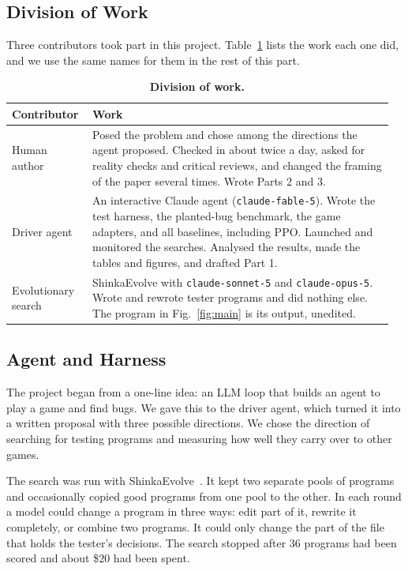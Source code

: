 \documentclass{article}
\begin{document}
\subsection{Division of Work}
\label{sec:roles}
Three contributors took part in this project. Table~\ref{tab:roles} lists the work each one did, and we use the same
names for them in the rest of this part.
\begin{table}[h]\centering\small
\caption{\textbf{Division of work.}}
\label{tab:roles}
\renewcommand{\arraystretch}{1.25}
\begin{tabular}{@{}>{\raggedright\arraybackslash}p{0.2\linewidth}>{\raggedright\arraybackslash}p{0.76\linewidth}@{}}\toprule
Contributor & Work \\ \midrule
Human author & Posed the problem and chose among the directions the agent proposed. Checked in about twice a day,
asked for reality checks and critical reviews, and changed the framing of the paper several times. Wrote Parts 2
and 3. \\ \midrule
Driver agent & An interactive Claude agent (\texttt{claude-fable-5}). Wrote the test harness, the planted-bug
benchmark, the game adapters, and all baselines, including PPO. Launched and monitored the searches. Analysed the
results, made the tables and figures, and drafted Part 1. \\ \midrule
Evolutionary search & ShinkaEvolve with \texttt{claude-sonnet-5} and \texttt{claude-opus-5}. Wrote and rewrote tester
programs and did nothing else. The program in Fig.~\ref{fig:main} is its output, unedited. \\ \bottomrule
\end{tabular}
\end{table}

\subsection{Agent and Harness}
\label{sec:agent}
The project began from a one-line idea: an LLM loop that builds an agent to play a game and find bugs. We gave this to
the driver agent, which turned it into a written proposal with three possible directions. We chose the direction of
searching for testing programs and measuring how well they carry over to other games.

The search was run with ShinkaEvolve~\citep{shinkaevolve}. It kept two separate pools of programs and occasionally
copied good programs from one pool to the other. In each round a model could change a program in three ways: edit part
of it, rewrite it completely, or combine two programs. It could only change the part of the file that holds the
tester's decisions. The search stopped after $36$ programs had been scored and about \$$20$ had been spent.
\end{document}
